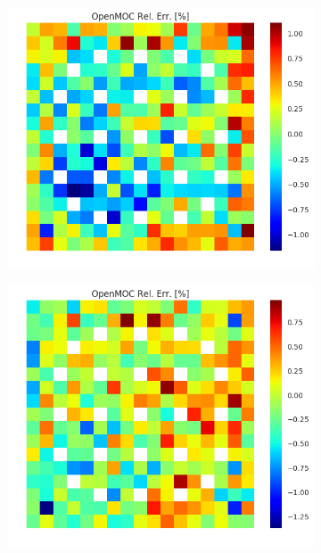 \begin{figure}[h!]
\begin{subfigure}{.33\textwidth}
  \caption{}
  \label{fig:chap8-assm-1.6-null-fiss-2}
\end{subfigure}%
\begin{subfigure}{.33\textwidth}
  \centering
  \includegraphics[width=\linewidth]{figures/quantification/assm-16/null-fiss-err-8}
  \caption{}
  \label{fig:chap8-assm-1.6-null-fiss-8}
\end{subfigure}%
\begin{subfigure}{.33\textwidth}
  \centering
  \includegraphics[width=\linewidth]{figures/quantification/assm-16/null-fiss-err-70}

\end{subfigure}
\end{figure}
